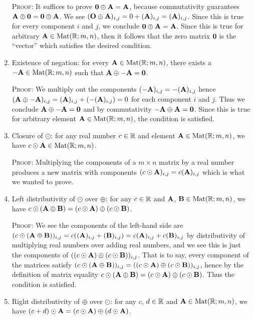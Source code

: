 \begin{example}
\begin{enumerate}[label=(\arabic*)]
  \textsc{Proof:} It suffices to
  prove $\mathbf{0}\oplus\mathbf{A}=\mathbf{A}$, because commutativity guarantees $\mathbf{A}\oplus\mathbf{0}=\mathbf{0}\oplus\mathbf{A}$.
  We see $(\mathbf{O}\oplus\mathbf{A})_{i,j} = 0 + (\mathbf{A})_{i,j} = (\mathbf{A})_{i,j}$.
  Since this is true for every component $i$ and $j$, we conclude
  $\mathbf{0}\oplus\mathbf{A}=\mathbf{A}$. Since this is true for arbitrary
  $\mathbf{A}\in\mathrm{Mat}(\mathbb{R};m,n)$, then it follows that the zero matrix
  $\mathbf{0}$ is the ``vector'' which satisfies the desired condition.
\item Existence of negation: for every $\mathbf{A}\in\mathrm{Mat}(\mathbb{R};m,n)$,
  there exists a $-\mathbf{A}\in\mathrm{Mat}(\mathbb{R};m,n)$ such that $\mathbf{A}\oplus-\mathbf{A}=\mathbf{0}$.

  \textsc{Proof:} We multiply out the components
  $(-\mathbf{A})_{i,j} = -(\mathbf{A})_{i,j}$ hence
  $(\mathbf{A}\oplus-\mathbf{A})_{i,j} = (\mathbf{A})_{i,j}+(-(\mathbf{A})_{i,j}) = 0$
  for each component $i$ and $j$. Thus we conclude
  $\mathbf{A}\oplus-\mathbf{A}=\mathbf{0}$ and by commutativity
  $-\mathbf{A}\oplus\mathbf{A}=\mathbf{0}$.
  Since this is true for arbitrary element $\mathbf{A}\in\mathrm{Mat}(\mathbb{R};m,n)$,
  the condition is satisfied.
\item Closure of $\odot$: for any real number $c\in\mathbb{R}$ and element
  $\mathbf{A}\in\mathrm{Mat}(\mathbb{R};m,n)$, we have $c\odot\mathbf{A}\in\mathrm{Mat}(\mathbb{R};m,n)$.

  \textsc{Proof:} 
  Multiplying the components of a $m\times n$ matrix by a real number
  produces a new matrix with components $(c\odot\mathbf{A})_{i,j}=c(\mathbf{A})_{i,j}$
  which is what we wanted to prove.
\item Left distributivity of $\odot$ over $\oplus$:
  for any $c\in\mathbb{R}$ and
  $\mathbf{A}$, $\mathbf{B}\in\mathrm{Mat}(\mathbb{R};m,n)$, we have
  $c\odot(\mathbf{A}\oplus\mathbf{B}) = (c\odot\mathbf{A})\oplus(c\odot\mathbf{B})$.

  \textsc{Proof:} 
  We see the components of the left-hand side are
  $(c\odot(\mathbf{A}\oplus\mathbf{B}))_{i,j} = c((\mathbf{A})_{i,j} + (\mathbf{B})_{i,j}) = c(\mathbf{A})_{i,j} + c(\mathbf{B})_{i,j}$
  by distributivity of multiplying real numbers over adding real
  numbers, and we see this is just the components of
  $((c\odot\mathbf{A})\oplus(c\odot\mathbf{B}))_{i,j}$. That is to say, every
  component of the matrices satisfy
  $(c\odot(\mathbf{A}\oplus\mathbf{B}))_{i,j} = ((c\odot\mathbf{A})\oplus(c\odot\mathbf{B}))_{i,j}$,
  hence by the definition of matrix equality
  $c\odot(\mathbf{A}\oplus\mathbf{B}) = (c\odot\mathbf{A})\oplus(c\odot\mathbf{B})$.
  Thus the condition is satisfied.
\item Right distributivity of $\oplus$ over $\odot$:
  for any $c$, $d\in\mathbb{R}$ and $\mathbf{A}\in\mathrm{Mat}(\mathbb{R};m,n)$, we have
  $(c+d)\odot\mathbf{A} = (c\odot\mathbf{A})\oplus(d\odot\mathbf{A})$.


\end{enumerate}
\end{example}

